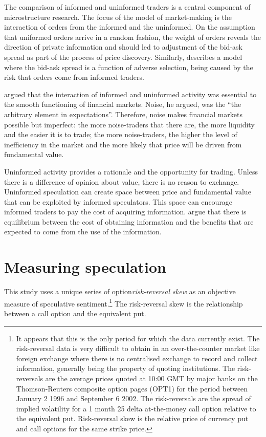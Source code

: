 \documentclass{article}
\begin{document}
The comparison of informed and uninformed traders is a central component of microstructure research.  The focus of the \citet{Kyle1985Continuous} model of market-making is the interaction of orders from the informed and the uninformed.  On the assumption that uniformed orders arrive in a random fashion, the weight of orders reveals the direction of private information and should led to adjustment of the bid-ask spread as part of the process of price discovery.  Similarly,  \citet{glosten1985bid} describes a model where the bid-ask spread is a function of adverse selection, being caused by the risk that orders come from informed traders.  

\citet[p.529]{BlackNoise} argued that the interaction of informed and uninformed activity was essential to the smooth functioning of financial markets. Noise, he argued, was the  ``the arbitrary element in expectations''. Therefore, noise makes financial markets possible but imperfect: the more noise-traders that there are, the more liquidity and the easier it is to trade; the more noise-traders, the higher the level of inefficiency in the market and the more likely that price will be driven from fundamental value. 

Uninformed activity provides a rationale and the opportunity for trading. Unless there is a difference of opinion about value, there is no reason to exchange. Uninformed speculation can create space between price and fundamental value that can be exploited by informed speculators.  This space can encourage informed traders to pay the cost of acquiring information.  \citet{Grossman1980Impossibility} argue that there is equilibrium between the cost of obtaining information and the benefits that are expected to come from the use of the information. 

\section{Measuring speculation}
This study uses a unique series of option\emph{risk-reversal skew} as an objective measure of speculative sentiment.\footnote{It appears that this is the only period for which the data currently exist.  The risk-reversal data is very difficult to obtain in an over-the-counter market like foreign exchange where there is no centralised exchange to record and collect information, generally being the property of quoting institutions.  The risk-reversals are the average prices quoted at 10:00 GMT by major banks on the Thomson-Reuters composite option pages (OPT1)  for the period between January 2 1996 and September 6 2002.  The risk-reversals are the spread of implied volatility for a 1 month 25 delta at-the-money call option relative to the equivalent put.  Risk-reversal skew is the relative price of currency put and call options for the same strike price.} The risk-reversal skew is the relationship between a call option and the equivalent put. 
\end{document}
